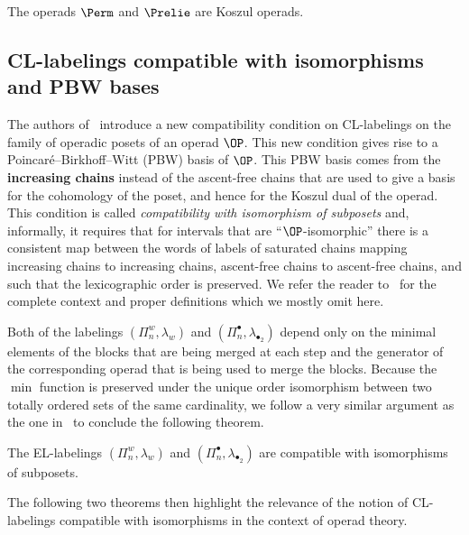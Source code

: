 \begin{theo}
    The operads $\Perm$ and $\Prelie$ are Koszul operads.   
\end{theo}

   \subsection{CL-labelings compatible with isomorphisms and PBW bases}


The authors of~\cite{BelliermillesDelcroixogerHoffbeck2021} introduce a new compatibility condition on CL-labelings on the family of operadic posets  of an operad $\OP$. This new condition gives rise to a Poincar\'e--Birkhoff--Witt (PBW) basis of $\OP$. This PBW basis comes from the {\bf increasing chains} instead of the ascent-free chains that are used to give a basis for the cohomology of the poset, and hence for the Koszul dual of the operad. This condition is called \emph{compatibility with isomorphism of subposets} and, informally, it requires that for intervals that are ``$\OP$-isomorphic'' there is a consistent map between the words of labels of saturated chains mapping increasing chains to increasing chains, ascent-free chains  to ascent-free chains, and such that the lexicographic  order is preserved.  We refer the reader to~\cite{BelliermillesDelcroixogerHoffbeck2021} for the complete context and proper definitions which we mostly omit here. 
  
    
 Both of the labelings $(\Pi_n^w,\lambda_w)$ and $(\Pi_n^{\bullet},\lambda_{\bullet_2})$ depend only on the minimal elements of the blocks that are being merged at each step and the generator of the corresponding operad that is being used to merge the blocks. Because the $\min$ function is preserved under the unique order isomorphism between two totally ordered sets of the same cardinality, we follow a very similar argument as the one in~\cite[Proposition 3.11]{BelliermillesDelcroixogerHoffbeck2021} to conclude the following theorem.
 \begin{theo}\label{theorem:pointed_weighted_isomorphism_subposets}
     The EL-labelings  $(\Pi_n^w,\lambda_w)$ and $(\Pi_n^{\bullet},\lambda_{\bullet_2})$ are compatible with isomorphisms of subposets.
 \end{theo}

 The following two theorems then highlight the relevance of the notion of CL-labelings compatible with isomorphisms in the context of operad theory.

